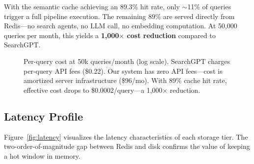 \documentclass[conference]{IEEEtran}
\begin{document}
With the semantic cache achieving an 89.3\% hit rate, only ${\sim}$11\% of queries trigger a full pipeline execution. The remaining 89\% are served directly from Redis---no search agents, no LLM call, no embedding computation. At 50{,}000 queries per month, this yields a \textbf{1{,}000$\times$ cost reduction} compared to SearchGPT.

\begin{figure}[h]
\centering
{}
\caption{Per-query cost at 50k queries/month (log scale). SearchGPT charges per-query API fees (\$0.22). Our system has zero API fees---cost is amortized server infrastructure (\$96/mo). With 89\% cache hit rate, effective cost drops to \$0.0002/query---a 1{,}000$\times$ reduction.}
\label{fig:cost}
\end{figure}

\subsection{Latency Profile}

Figure~\ref{fig:latency} visualizes the latency characteristics of each storage tier. The two-order-of-magnitude gap between Redis and disk confirms the value of keeping a hot window in memory.
\end{document}

